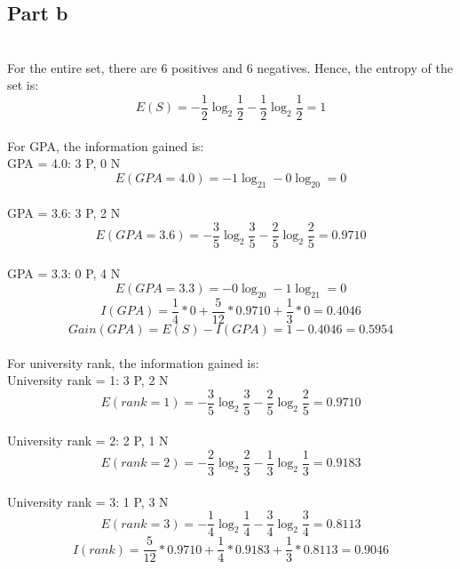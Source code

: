 \documentclass[12pt]{article}
\begin{document}
\subsection*{Part b}
\\
For the entire set, there are 6 positives and 6 negatives. Hence, the entropy of the set is:
\\
\begin{equation}
E(S) = -\frac{1}{2}\log_2\frac{1}{2} -\frac{1}{2}\log_2\frac{1}{2} = 1
\end{equation}
\\
For GPA, the information gained is:
\\
GPA = 4.0: 3 P, 0 N
\begin{equation}
E(GPA = 4.0) = -1\log_21 -0\log_20 = 0
\end{equation}
\\
GPA = 3.6: 3 P, 2 N
\begin{equation}
E(GPA = 3.6) = -\frac{3}{5}\log_2\frac{3}{5} -\frac{2}{5}\log_2\frac{2}{5} = 0.9710
\end{equation}
\\
GPA = 3.3: 0 P, 4 N
\begin{equation}
E(GPA = 3.3) = -0\log_20 -1\log_21 = 0
\end{equation}
\begin{equation}
I(GPA) = \frac{1}{4} * 0 + \frac{5}{12} * 0.9710 + \frac{1}{3} * 0 = 0.4046
\end{equation}
\begin{equation}
Gain(GPA) = E(S) - I(GPA) = 1 - 0.4046 = 0.5954
\end{equation}
\\
For university rank, the information gained is:
\\
University rank = 1: 3 P, 2 N
\begin{equation}
E(rank = 1) = -\frac{3}{5}\log_2\frac{3}{5} -\frac{2}{5}\log_2\frac{2}{5} = 0.9710
\end{equation}
\\
University rank = 2: 2 P, 1 N
\begin{equation}
E(rank = 2) = -\frac{2}{3}\log_2\frac{2}{3} -\frac{1}{3}\log_2\frac{1}{3} = 0.9183
\end{equation}
\\
University rank = 3: 1 P, 3 N
\begin{equation}
E(rank = 3) = -\frac{1}{4}\log_2\frac{1}{4} -\frac{3}{4}\log_2\frac{3}{4} = 0.8113
\end{equation}
\begin{equation}
I(rank) = \frac{5}{12} * 0.9710 + \frac{1}{4} * 0.9183 + \frac{1}{3} * 0.8113 = 0.9046
\end{equation}
\end{document}
